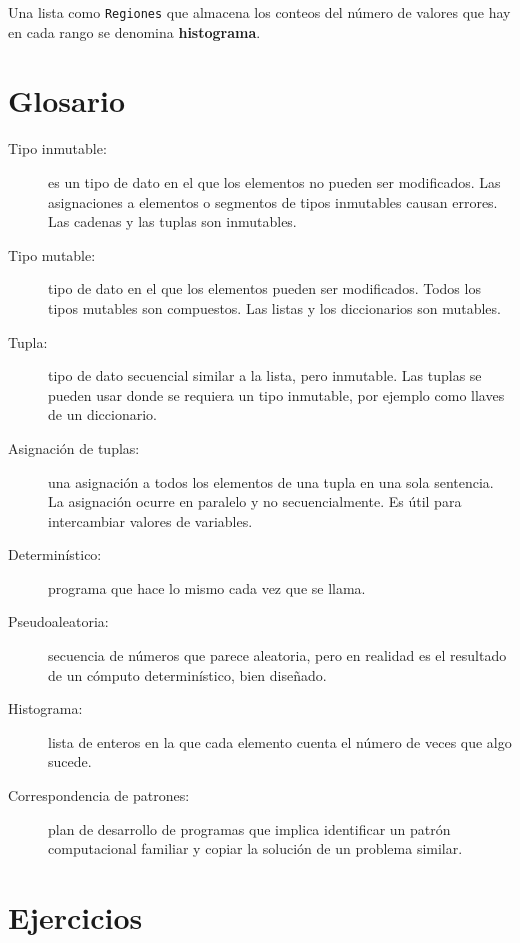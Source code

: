 Una lista como \texttt{Regiones} que almacena los conteos del número
de valores que hay en cada rango se denomina \textbf{histograma}.

\section{Glosario}
\begin{description}
\item [{Tipo inmutable:}] es un tipo de dato en el que los elementos no
pueden ser modificados. Las asignaciones a elementos o segmentos de
tipos inmutables causan errores. Las cadenas y las tuplas son inmutables.
\item [{Tipo mutable:}] tipo de dato en el que los elementos pueden ser
modificados. Todos los tipos mutables son compuestos. Las listas y
los diccionarios son mutables.
\item [{Tupla:}] tipo de dato secuencial similar a la lista, pero inmutable.
Las tuplas se pueden usar donde se requiera un tipo inmutable, por
ejemplo como llaves de un diccionario.
\item [{Asignación de tuplas:}] una asignación a todos los elementos
de una tupla en una sola sentencia. La asignación ocurre en paralelo
y no secuencialmente. Es útil para intercambiar valores de variables.
\item [{Determinístico:}] programa que hace lo mismo cada vez que se llama.
\item [{Pseudoaleatoria:}] secuencia de números que parece aleatoria, pero
en realidad es el resultado de un cómputo determinístico, bien diseñado.
\item [{Histograma:}] lista de enteros en la que cada elemento cuenta el
número de veces que algo sucede.
\item [{Correspondencia de patrones:}] plan de desarrollo de programas
que implica identificar un patrón computacional familiar y copiar
la solución de un problema similar.

   
  
 
\end{description}

\section{Ejercicios}


